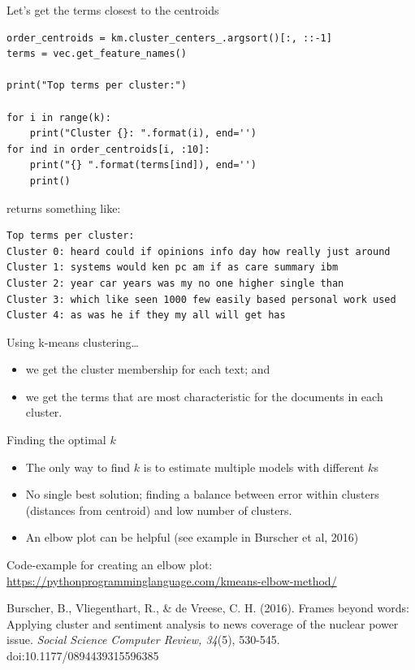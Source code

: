 \documentclass[compress]{beamer}
\begin{document}
\begin{frame}{Let's get the terms closest to the centroids}
\begin{lstlisting}
order_centroids = km.cluster_centers_.argsort()[:, ::-1]
terms = vec.get_feature_names()

print("Top terms per cluster:")

for i in range(k):
    print("Cluster {}: ".format(i), end='')
for ind in order_centroids[i, :10]:
    print("{} ".format(terms[ind]), end='')
    print()
\end{lstlisting}
\pause
returns something like:

\begin{lstlisting}
Top terms per cluster:
Cluster 0: heard could if opinions info day how really just around 
Cluster 1: systems would ken pc am if as care summary ibm 
Cluster 2: year car years was my no one higher single than 
Cluster 3: which like seen 1000 few easily based personal work used 
Cluster 4: as was he if they my all will get has 
\end{lstlisting}
\end{frame}


\begin{frame}{Using k-means clustering\ldots}
\begin{itemize}
\item we get the cluster membership for each text; and
\item we get the terms that are most characteristic for the documents in each cluster.
\end{itemize}
\end{frame}

\begin{frame}{Finding the optimal $k$}

\begin{itemize}
\item The only way to find $k$ is to estimate multiple models with different $k$s
\item No single best solution; finding a balance between error within clusters (distances from centroid) and low number of clusters.
\item An elbow plot can be helpful (see example in Burscher et al, 2016)
\end{itemize}

\pause

\footnotesize 
Code-example for creating an elbow plot:
\url{https://pythonprogramminglanguage.com/kmeans-elbow-method/}



\tiny{Burscher, B., Vliegenthart, R., \& de Vreese, C. H. (2016). Frames beyond words: Applying cluster and sentiment analysis to news coverage of the
nuclear power issue.\textit{ Social Science Computer Review, 34}(5), 530-545. doi:10.1177/0894439315596385}
\end{frame}
\end{document}
